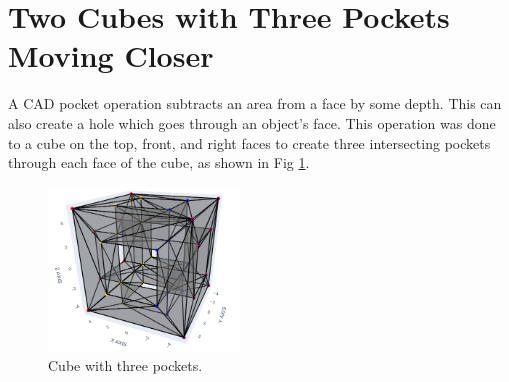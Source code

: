 \documentclass[ma]{uncgdissertationexp}
\theoremstyle{plain}
\theoremstyle{definition}
\theoremstyle{remark}
\begin{document}
\section{Two Cubes with Three Pockets Moving Closer}
\label{sec:two_cubes}
A CAD pocket operation subtracts an area from a face by some depth. This can also create a hole which goes through an object's face. This operation was done to a cube on the top, front, and right faces to create three intersecting pockets through each face of the cube, as shown in Fig \ref{fig:three_pocket_example}.
\begin{figure}[H]
\begin{center}
	\includegraphics[width=0.45\textwidth]{one cube three pockets each.png}
    \caption{Cube with three pockets.}
\label{fig:three_pocket_example}
\end{center}
\end{figure}
\newpage
\end{document}

